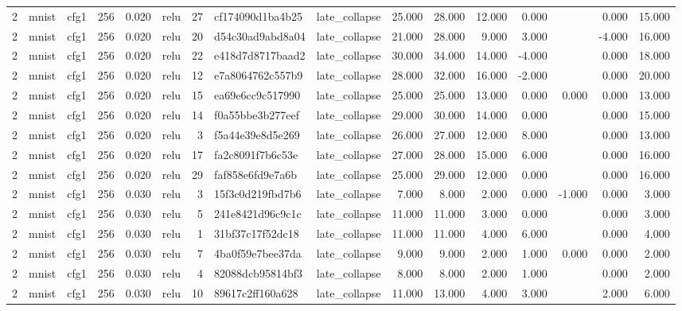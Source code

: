 \begin{table}[htbp]
{\begin{tabular}{@{}rllrrlrllrrrrrrr@{}}
2 & mnist & cfg1 & 256 & 0.020 & relu & 27 & cf174090d1ba4b25 & late\_collapse & 25.000 & 28.000 & 12.000 & 0.000 &  & 0.000 & 15.000 \\
2 & mnist & cfg1 & 256 & 0.020 & relu & 20 & d54c30ad9abd8a04 & late\_collapse & 21.000 & 28.000 & 9.000 & 3.000 &  & -4.000 & 16.000 \\
2 & mnist & cfg1 & 256 & 0.020 & relu & 22 & e418d7d8717baad2 & late\_collapse & 30.000 & 34.000 & 14.000 & -4.000 &  & 0.000 & 18.000 \\
2 & mnist & cfg1 & 256 & 0.020 & relu & 12 & e7a8064762c557b9 & late\_collapse & 28.000 & 32.000 & 16.000 & -2.000 &  & 0.000 & 20.000 \\
2 & mnist & cfg1 & 256 & 0.020 & relu & 15 & ea69e6cc9c517990 & late\_collapse & 25.000 & 25.000 & 13.000 & 0.000 & 0.000 & 0.000 & 13.000 \\
2 & mnist & cfg1 & 256 & 0.020 & relu & 14 & f0a55bbe3b277eef & late\_collapse & 29.000 & 30.000 & 14.000 & 0.000 &  & 0.000 & 15.000 \\
2 & mnist & cfg1 & 256 & 0.020 & relu & 3 & f5a44e39e8d5e269 & late\_collapse & 26.000 & 27.000 & 12.000 & 8.000 &  & 0.000 & 13.000 \\
2 & mnist & cfg1 & 256 & 0.020 & relu & 17 & fa2c8091f7b6c53e & late\_collapse & 27.000 & 28.000 & 15.000 & 6.000 &  & 0.000 & 16.000 \\
2 & mnist & cfg1 & 256 & 0.020 & relu & 29 & faf858e6fd9e7a6b & late\_collapse & 25.000 & 29.000 & 12.000 & 0.000 &  & 0.000 & 16.000 \\
2 & mnist & cfg1 & 256 & 0.030 & relu & 3 & 15f3c0d219fbd7b6 & late\_collapse & 7.000 & 8.000 & 2.000 & 0.000 & -1.000 & 0.000 & 3.000 \\
2 & mnist & cfg1 & 256 & 0.030 & relu & 5 & 241e8421d96c9c1c & late\_collapse & 11.000 & 11.000 & 3.000 & 0.000 &  & 0.000 & 3.000 \\
2 & mnist & cfg1 & 256 & 0.030 & relu & 1 & 31bf37c17f52dc18 & late\_collapse & 11.000 & 11.000 & 4.000 & 6.000 &  & 0.000 & 4.000 \\
2 & mnist & cfg1 & 256 & 0.030 & relu & 7 & 4ba0f59e7bee37da & late\_collapse & 9.000 & 9.000 & 2.000 & 1.000 & 0.000 & 0.000 & 2.000 \\
2 & mnist & cfg1 & 256 & 0.030 & relu & 4 & 82088dcb95814bf3 & late\_collapse & 8.000 & 8.000 & 2.000 & 1.000 &  & 0.000 & 2.000 \\
2 & mnist & cfg1 & 256 & 0.030 & relu & 10 & 89617c2ff160a628 & late\_collapse & 11.000 & 13.000 & 4.000 & 3.000 &  & 2.000 & 6.000 \\

\end{tabular}}
\end{table}
